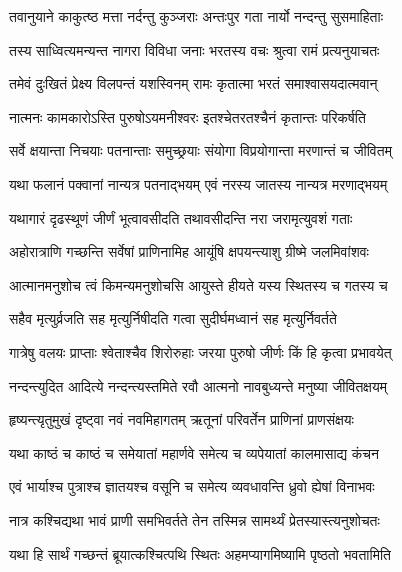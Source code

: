 \twolineshloka
{तवानुयाने काकुत्ष्ठ मत्ता नर्दन्तु कुञ्जराः}
{अन्तःपुर गता नार्यो नन्दन्तु सुसमाहिताः} %

\twolineshloka
{तस्य साध्वित्यमन्यन्त नागरा विविधा जनाः}
{भरतस्य वचः श्रुत्वा रामं प्रत्यनुयाचतः} %

\twolineshloka
{तमेवं दुःखितं प्रेक्ष्य विलपन्तं यशस्विनम्}
{रामः कृतात्मा भरतं समाश्वासयदात्मवान्} %

\twolineshloka
{नात्मनः कामकारोऽस्ति पुरुषोऽयमनीश्वरः}
{इतश्चेतरतश्चैनं कृतान्तः परिकर्षति} %

\twolineshloka
{सर्वे क्षयान्ता निचयाः पतनान्ताः समुच्छ्रयाः}
{संयोगा विप्रयोगान्ता मरणान्तं च जीवितम्} %

\twolineshloka
{यथा फलानं पक्वानां नान्यत्र पतनाद्भयम्}
{एवं नरस्य जातस्य नान्यत्र मरणाद्भयम्} %

\twolineshloka
{यथागारं दृढस्थूणं जीर्णं भूत्वावसीदति}
{तथावसीदन्ति नरा जरामृत्युवशं गताः} %

\twolineshloka
{अहोरात्राणि गच्छन्ति सर्वेषां प्राणिनामिह}
{आयूंषि क्षपयन्त्याशु ग्रीष्मे जलमिवांशवः} %

\twolineshloka
{आत्मानमनुशोच त्वं किमन्यमनुशोचसि}
{आयुस्ते हीयते यस्य स्थितस्य च गतस्य च} %

\twolineshloka
{सहैव मृत्युर्व्रजति सह मृत्युर्निषीदति}
{गत्वा सुदीर्घमध्वानं सह मृत्युर्निवर्तते} %

\twolineshloka
{गात्रेषु वलयः प्राप्ताः श्वेताश्चैव शिरोरुहाः}
{जरया पुरुषो जीर्णः किं हि कृत्वा प्रभावयेत्} %

\twolineshloka
{नन्दन्त्युदित आदित्ये नन्दन्त्यस्तमिते रवौ}
{आत्मनो नावबुध्यन्ते मनुष्या जीवितक्षयम्} %

\twolineshloka
{हृष्यन्त्यृतुमुखं दृष्ट्वा नवं नवमिहागतम्}
{ऋतूनां परिवर्तेन प्राणिनां प्राणसंक्षयः} %

\twolineshloka
{यथा काष्ठं च काष्ठं च समेयातां महार्णवे}
{समेत्य च व्यपेयातां कालमासाद्य कंचन} %

\twolineshloka
{एवं भार्याश्च पुत्राश्च ज्ञातयश्च वसूनि च}
{समेत्य व्यवधावन्ति ध्रुवो ह्येषां विनाभवः} %

\twolineshloka
{नात्र कश्चिद्यथा भावं प्राणी समभिवर्तते}
{तेन तस्मिन्न सामर्थ्यं प्रेतस्यास्त्यनुशोचतः} %

\twolineshloka
{यथा हि सार्थं गच्छन्तं ब्रूयात्कश्चित्पथि स्थितः}
{अहमप्यागमिष्यामि पृष्ठतो भवतामिति} %

